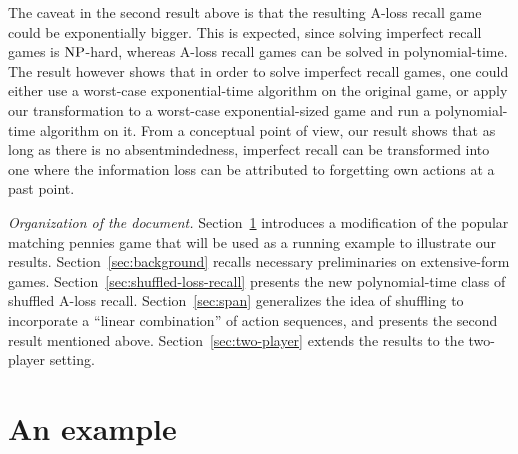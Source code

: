  


The caveat in the second result above is that the resulting A-loss recall game could be exponentially bigger. This is expected, since solving imperfect recall games is $\operatorname{NP}$-hard, whereas A-loss recall games can be solved in polynomial-time. The result however shows that in order to solve imperfect recall games, one could either use a worst-case exponential-time algorithm on the original game, or apply our transformation to a worst-case exponential-sized game and run a polynomial-time algorithm on it. From a conceptual point of view, our result shows that as long as there is no absentmindedness, imperfect recall can be transformed into one where the information loss can be attributed to forgetting own actions at a past point.


\emph{Organization of the document.} Section~\ref{sec:an-example} introduces a modification of the popular matching pennies game that will be used as a running example to illustrate our results. Section~\ref{sec:background} recalls necessary preliminaries on extensive-form games. Section~\ref{sec:shuffled-loss-recall} presents the new polynomial-time class of shuffled A-loss recall. Section~\ref{sec:span} generalizes the idea of shuffling to incorporate a ``linear combination'' of action sequences, and presents the second result mentioned above. Section~\ref{sec:two-player} extends the results to the two-player setting. 

  






  



\section{An example}
\label{sec:an-example}



